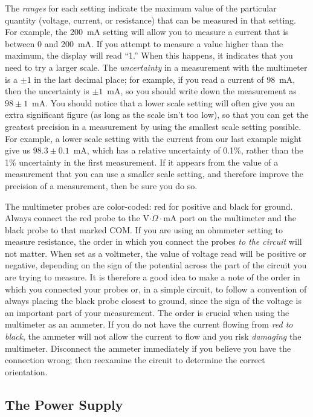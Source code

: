 The {\it ranges} for each setting indicate the maximum value of the particular
quantity (voltage, current, or resistance) that can be measured in that 
setting.  For example, the 200~mA setting will allow you to measure a current
that is between 0 and 200~mA. If you attempt to measure a value higher than the
maximum, the display will read ``1.''  When this happens, it indicates that you
need to try a larger scale.  The {\it uncertainty} in a measurement with
the multimeter is a $\pm 1$ in the last decimal place; for example, if you read
a current of 98~mA, then the uncertainty is $\pm 1$~mA, so you should write
down the measurement as $98\pm 1$~mA.  You should notice that a lower scale
setting will often give you an extra significant figure (as long as the scale 
isn't too low), so that you can get the greatest precision in a measurement by 
using the smallest scale setting possible.  For example, a lower scale setting
with the current from our last example might give us $98.3\pm 0.1$~mA, which 
has a relative uncertainty of 0.1\%, rather than the 1\% uncertainty in the 
first measurement. If it appears from the value of a measurement that you can 
use a smaller scale setting, and therefore improve the precision of a 
measurement, then be sure you do so.

The multimeter probes are color-coded: red for positive and black for ground.
Always connect the red probe to the V$\cdot\Omega\cdot$mA port on the 
multimeter and the black probe to that marked COM. If you are using an 
ohmmeter setting to measure resistance, the order in which you connect the 
probes {\it to the circuit} will not matter.  When set as a voltmeter, the 
value of voltage read will be positive or negative, depending on the sign of 
the potential across the part of the circuit you are trying to measure.  It is 
therefore a good idea to make a note of the order in which you connected your 
probes or, in a simple circuit, to follow a convention of always placing the 
black probe closest to ground, since the sign of the voltage is an important 
part of your measurement.  The order is crucial when using the multimeter as 
an ammeter.  If you do not have the current flowing from {\it red to black}, 
the ammeter will not allow the current to flow and you risk {\it damaging} the 
multimeter. Disconnect the ammeter immediately if you believe you have the 
connection wrong; then reexamine the circuit to determine the correct 
orientation. 

\subsection{The Power Supply}
 
